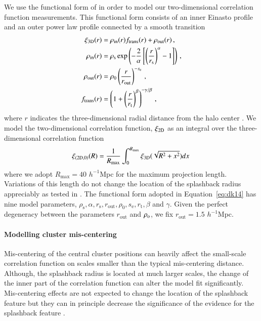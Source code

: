 \documentclass[iop, apjl, twocolappendix, numberedappendix]{emulateapj}
\begin{document}
We use the functional form of \citet{diemer2014dependence} in order
to model our two-dimensional correlation function measurements. This
functional form consists of an inner Einasto profile and an outer
power law profile connected by a smooth transition
\begin{align}
\xi_{\rm 3D}(r) &= \rho_{\mathrm{in}}(r)f_{\mathrm{trans}}(r) + \rho_{\mathrm{out}}(r)\,, \\
\rho_{\mathrm{in}}(r)&=\rho_{\mathrm{s}}\exp\left( -\frac{2}{\alpha}\left[ \left( \frac{r}{r_{\mathrm{s}}}\right)^{\alpha}-1 \right] \right)\,,\\
\rho_{\mathrm{out}}(r)&=\rho_{\mathrm{0}}\left( \frac{r}{r_{\mathrm{out}}}\right)^{-s_{\mathrm{e}}} \,,\label{eq:model} \\
f_{\mathrm{trans}}(r)&=\left( 1+\left( \frac{r}{r_{\mathrm{t}}} \right)^{\beta} \right)^{-\gamma/ \beta}\,,
\label{eq:dk14}
\end{align}
where $r$ indicates the three-dimensional radial distance from the
halo center \citep{diemer2014dependence}. We model the
two-dimensional correlation function, $\xi_{\rm 2D}$ as an integral
over the three-dimensional correlation function
\begin{equation}
\xi_{\rm (2D,0)}(R)=\frac{1}{R_{\rm max}}\int^{R_{\mathrm{max}}}_0 \xi_{\rm 3D}(\sqrt{R^2+x^2}) dx \,
\label{eq:surface}
\end{equation}
where we adopt $R_{\mathrm{max}}=40$ $h^{-1}$Mpc for the maximum projection
length. Variations of this length do not change the location of the
splashback radius appreciably as tested in
\citet{more2016detection}. The functional form adopted in
Equation~\ref{eq:dk14} has nine model parameters,
$\rho_{\mathrm{s}}, \alpha, r_{\mathrm{s}}, r_{\mathrm{out}},
\rho_{\mathrm{0}}, s_{\mathrm{e}}, r_{\mathrm{t}}, \beta$ and
$\gamma$. Given the perfect degeneracy between the parameters
$r_{\mathrm{out}}$ and $\rho_{\rm o}$, we fix $r_{\mathrm{out}}=1.5$ $
h^{-1}$Mpc. 

\paragraph{Modelling cluster mis-centering}
\label{sec:mis-centering}
Mis-centering of the central cluster positions can heavily affect 
the small-scale correlation function on scales smaller than the typical mis-centering distance. 
Although, the splashback radius is located at much larger scales, 
the change of the inner part of the correlation function can alter the model fit significantly. Mis-centering effects are not expected to change the location of the splashback feature but they can in principle decrease the significance of the evidence for the splashback feature \citep{baxter2017halo}.
  
\end{document}

